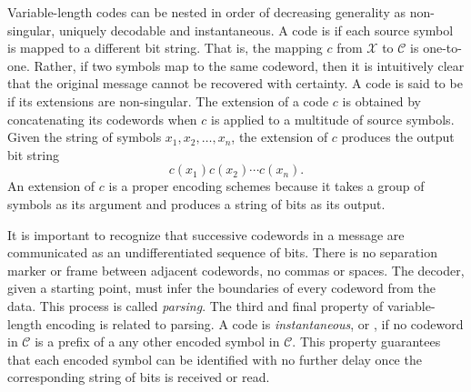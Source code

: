Variable-length codes can be nested in order of decreasing generality as non-singular, uniquely decodable and instantaneous.
A code is  if each source symbol is mapped to a different bit string.
That is, the mapping $c$ from $\mathcal{X}$ to $\mathcal{C}$ is one-to-one.
Rather, if two symbols map to the same codeword, then it is intuitively clear that the original message cannot be recovered with certainty.
A code is said to be  if its extensions are non-singular.
The extension of a code $c$ is obtained by concatenating its codewords when $c$ is applied to a multitude of source symbols.
Given the string of symbols $x_1, x_2, \ldots, x_n$, the extension of $c$ produces the output bit string
\begin{equation*}
c(x_1) c(x_2) \cdots c(x_n) .
\end{equation*}
An extension of $c$ is a proper encoding schemes because it takes a group of symbols as its argument and produces a string of bits as its output.

It is important to recognize that successive codewords in a message are communicated as an undifferentiated sequence of bits.
There is no separation marker or frame between adjacent codewords, no commas or spaces.
The decoder, given a starting point, must infer the boundaries of every codeword from the data.
This process is called \emph{parsing}.
The third and final property of variable-length encoding is related to parsing.
A code is \emph{instantaneous}, or , if no codeword in $\mathcal{C}$ is a prefix of a any other encoded symbol in $\mathcal{C}$.
This property guarantees that each encoded symbol can be identified with no further delay once the corresponding string of bits is received or read.


